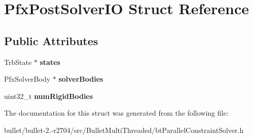 \hypertarget{struct_pfx_post_solver_i_o}{\section{Pfx\+Post\+Solver\+I\+O Struct Reference}
\label{struct_pfx_post_solver_i_o}
}
\subsection*{Public Attributes}
\begin{DoxyCompactItemize}
\item 
\hypertarget{struct_pfx_post_solver_i_o_a79373a4c88a7cd110699b390f58c397c}{Trb\+State $\ast$ {\bfseries states}}\label{struct_pfx_post_solver_i_o_a79373a4c88a7cd110699b390f58c397c}

\item 
\hypertarget{struct_pfx_post_solver_i_o_a7ba7f8885171b5d74a504183ae98c361}{Pfx\+Solver\+Body $\ast$ {\bfseries solver\+Bodies}}\label{struct_pfx_post_solver_i_o_a7ba7f8885171b5d74a504183ae98c361}

\item 
\hypertarget{struct_pfx_post_solver_i_o_ae952e4b6a5768e9c5d754693d7457aff}{uint32\+\_\+t {\bfseries num\+Rigid\+Bodies}}\label{struct_pfx_post_solver_i_o_ae952e4b6a5768e9c5d754693d7457aff}

\end{DoxyCompactItemize}


The documentation for this struct was generated from the following file\+:\begin{DoxyCompactItemize}
\item 
bullet/bullet-\/2.-\/r2704/src/\+Bullet\+Multi\+Threaded/bt\+Parallel\+Constraint\+Solver.\+h\end{DoxyCompactItemize}
